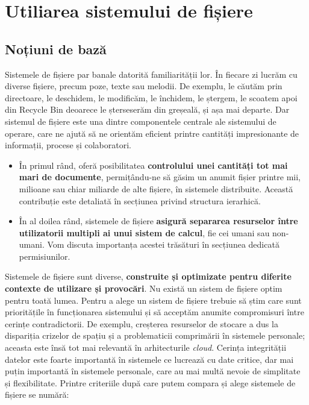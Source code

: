 \chapter{Utiliarea sistemului de fișiere}
\label{chapter:file-system}

\section{Noțiuni de bază}
\label{sec:file-system-baza}

Sistemele de fișiere par banale datorită familiarității lor. În fiecare zi
lucrăm cu diverse fișiere, precum poze, texte sau melodii. De exemplu, le
căutăm prin directoare, le deschidem, le modificăm, le închidem, le ștergem, le
scoatem apoi din Recycle Bin deoarece le șterseserăm din greșeală, și așa mai
departe. Dar sistemul de fișiere este una dintre componentele centrale ale
sistemului de operare, care ne ajută să ne orientăm eficient printre cantități
impresionante de informații, procese și colaboratori.

\begin{itemize}
	\item În primul rând, oferă posibilitatea \textbf{controlului unei
		cantități tot mai mari de documente}, permițându-ne să găsim un
		anumit fișier printre mii, milioane sau chiar miliarde de alte
		fișiere, în sistemele distribuite. Această contribuție este
		detaliată în secțiunea privind structura ierarhică.
	\item În al doilea rând, sistemele de fișiere \textbf{asigură separarea
		resurselor între utilizatorii multipli ai unui sistem de
		calcul}, fie cei umani sau non-umani. Vom discuta importanța
		acestei trăsături în secțiunea dedicată permisiunilor.
\end{itemize}

Sistemele de fișiere sunt diverse, \textbf{construite și optimizate pentru
diferite contexte de utilizare și provocări}. Nu există un sistem de fișiere
optim pentru toată lumea. Pentru a alege un sistem de fișiere trebuie să știm
care sunt prioritățile în funcționarea sistemului și să acceptăm anumite
compromisuri între cerințe contradictorii. De exemplu, creșterea resurselor de
stocare a dus la dispariția crizelor de spațiu și a problematicii comprimării în
sistemele personale; aceasta este însă tot mai relevantă în arhitecturile
\textit{cloud}. Cerința integrității datelor este foarte importantă în sistemele
ce lucrează cu date critice, dar mai puțin importantă în sistemele personale,
care au mai multă nevoie de simplitate și flexibilitate. Printre criteriile după
care putem compara și alege sistemele de fișiere se numără:

